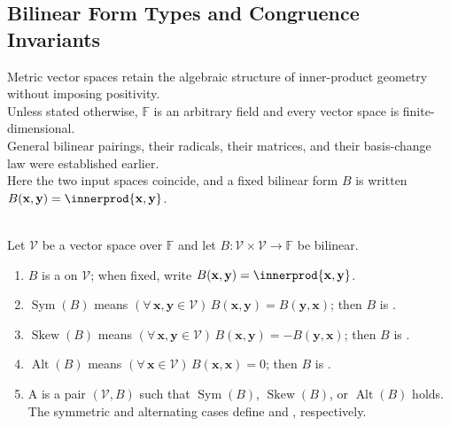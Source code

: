 \subsection{Bilinear Form Types and Congruence Invariants}\label{subsec:metric-vector-spaces-and-bilinear-forms}

%

Metric vector spaces retain the algebraic structure of inner-product geometry without imposing positivity.\\
Unless stated otherwise, $\mathbb{F}$ is an arbitrary field and every vector space is finite-dimensional.\\
General bilinear pairings, their radicals, their matrices, and their basis-change law were established earlier.\\
Here the two input spaces coincide, and a fixed bilinear form $B$ is written $B(\mathbf{x},\mathbf{y})=\innerprod{\mathbf{x},\mathbf{y}}$.

\begin{definition} \label{def:metric-vector-space-basic-form-types} \\
Let $\mathcal{V}$ be a vector space over $\mathbb{F}$ and let $B:\mathcal{V}\times\mathcal{V}\to\mathbb{F}$ be bilinear.
\begin{enumerate}[label=(\roman*)]
\setlength{\itemsep}{0pt}
\item $B$ is a  on $\mathcal{V}$; when fixed, write $B(\mathbf{x},\mathbf{y})=\innerprod{\mathbf{x},\mathbf{y}}$.
\item $\operatorname{Sym}(B)$ means $(\forall\,\mathbf{x},\mathbf{y}\in\mathcal{V})\,B(\mathbf{x},\mathbf{y})=B(\mathbf{y},\mathbf{x})$; then $B$ is .
\item $\operatorname{Skew}(B)$ means $(\forall\,\mathbf{x},\mathbf{y}\in\mathcal{V})\,B(\mathbf{x},\mathbf{y})=-B(\mathbf{y},\mathbf{x})$; then $B$ is .
\item $\operatorname{Alt}(B)$ means $(\forall\,\mathbf{x}\in\mathcal{V})\,B(\mathbf{x},\mathbf{x})=0$; then $B$ is .
\item A  is a pair $(\mathcal{V},B)$ such that $\operatorname{Sym}(B)$, $\operatorname{Skew}(B)$, or $\operatorname{Alt}(B)$ holds.\\
The symmetric and alternating cases define  and , respectively.
\end{enumerate}
\end{definition}

